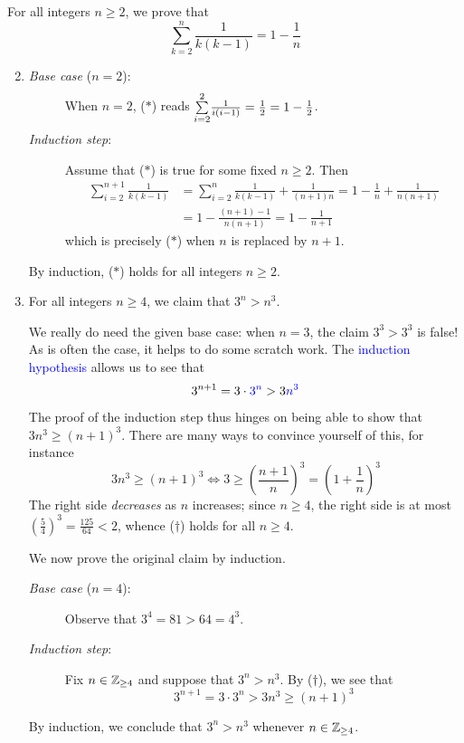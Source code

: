\begin{examples}{}{}
	\exstart For all integers $n\ge 2$, we prove that\footnotemark
	\[
		\sum\limits_{k=2}^n\frac 1{k(k-1)} =1-\frac 1n\tag{$\ast$}
	\]	
	\begin{enumerate}\setcounter{enumi}{1}
		\item[]\begin{description}
			\item[\normalfont\emph{Base case} ($n=2$):] When $n=2$, ($\ast$) reads $\smash{\sum\limits_{i=2}^2}\frac 1{i(i-1)}=\frac 12=1-\frac 12$.
			\item[\normalfont\emph{Induction step}:] Assume that ($\ast$) is true for some fixed $n\ge 2$. Then
			\begin{align*}
				\sum_{i=2}^{n+1}\frac 1{k(k-1)}
				&=\sum_{i=2}^{n}\frac 1{k(k-1)}+\frac 1{(n+1)n} 
					=1-\frac 1n+\frac 1{n(n+1)}
					\tag{induction hypothesis}\\
				&=1-\frac{(n+1)-1}{n(n+1)}
					=1-\frac 1{n+1}
			\end{align*}
			which is precisely ($\ast$) when $n$ is replaced by $n+1$.
		\end{description}
		By induction, ($\ast$) holds for all integers $n\ge 2$.
	
	  \item For all integers $n\ge 4$, we claim that $3^n>n^3$.\par
	  We really do need the given base case: when $n=3$, the claim $3^3>3^3$ is false! As is often the case, it helps to do some scratch work. The \textcolor{blue}{induction hypothesis} allows us to see that 
	  \[
	  	3^{n+1}=3\cdot \textcolor{blue}{3^n} >3 \textcolor{blue}{n^3}
	  \] 
	  The proof of the induction step thus hinges on being able to show that $3n^3\ge (n+1)^3$. There are many ways to convince yourself of this, for instance
	  \[
	  	3n^3\ge(n+1)^3\iff 3\ge\left(\frac{n+1}n\right)^3 =\left(1+\frac 1n\right)^3 \tag{$\dag$}
	  \]
	  The right side \emph{decreases} as $n$ increases; since $n\ge 4$, the right side is at most $\left(\frac 54\right)^3=\frac{125}{64}<2$, whence ($\dag$) holds for all $n\ge 4$.\smallbreak
	  
	  We now prove the original claim by induction.	  
	  \begin{description}
	  	\item[\normalfont\emph{Base case} ($n=4$):] Observe that $3^4=81>64=4^3$.
	  	\item[\normalfont\emph{Induction step}:] Fix $n\in\mathbb{Z}_{\ge 4}$ and suppose that $3^n>n^3$. By ($\dag$), we see that
			\[
				3^{n+1}=3\cdot 3^n>3n^3\ge (n+1)^3
			\]
	  \end{description}
	  By induction, we conclude that $3^n>n^3$ whenever $n\in\mathbb{Z}_{\ge 4}$.
	\end{enumerate}
\end{examples}


